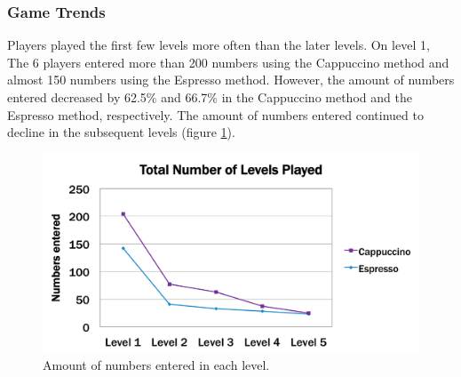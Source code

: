 \subsubsection{Game Trends}
Players played the first few levels more often than the later levels. On level 1, The 6 players entered more than 200 numbers using the Cappuccino method and almost 150 numbers using the Espresso method. However, the amount of numbers entered decreased by 62.5\% and 66.7\% in the Cappuccino method and the Espresso method, respectively. The amount of numbers entered continued to decline in the subsequent levels (figure \ref{levels-played}).
\begin{figure}[!htbp]
  \centering
  \includegraphics[width=1.0\textwidth]{figures/levels-played.png}
  \caption{Amount of numbers entered in each level.}
  \label{levels-played}
\end{figure}
